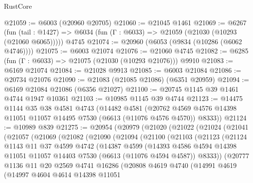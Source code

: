 \begin{lexlean}{RustCore}
\begin{coremodule}
@21059 := @6003 (@20960 @20705)
@21060 := @21045 @1461
@21069 := @6267
    (fun (tail : @1427) => @6034 (fun (Γ : @6033) => @21059 (@21030 (@10293 (@21060 @6065)))))
    @4745
@21074 := @20960 (@6053 (@9834 (@10286 (@6062 @4746))))
@21075 := @6003 @21074
@21076 := @21060 @4745
@21082 := @6285 (fun (Γ : @6033) => @21075 (@21030 (@10293 @21076))) @9910
@21083 := @6169 @21074
@21084 := @21028 @9913
@21085 := @6003 @21084
@21086 := @20734 @21076
@21090 := @21083 (@21085 @21086) (@6351 @20959)
@21094 := @6169 @21084 @21086 (@6356 @21027)
@21100 := @20745 @1145 @39 @1461 @4744 @1947 @10361
@21103 := @10985 @1145 @39 @4744
@21123 := @14475
    @1144
    @35
    @38
    @4581
    @4743
    (@14482
      @4581
      (@20762 @4569 @4576 @14398 @11051 @11057 @14495 @7530 (@6613 (@11076 @4576 @4570)) @8333))
@21124 := @10989 @839
@21275 := @20954
    (@20979
      (@21020
        (@21022
          (@21024
            (@21041
              (@21057
                (@21069
                  (@21082
                    (@21090
                      (@21094
                        (@21100
                          (@21103
                            (@21123
                              (@21124
                                @1143
                                @11
                                @37
                                @4599
                                @4742
                                (@14387
                                  @4599
                                  (@14393
                                    @4586
                                    @4594
                                    @14398
                                    @11051
                                    @11057
                                    @14403
                                    @7530
                                    (@6613 (@11076 @4594 @4587))
                                    @8333))
                                (@20777
                                  @1136
                                  @11
                                  @20
                                  @2569
                                  @4741
                                  @16286
                                  (@20808
                                    @4619
                                    @4740
                                    (@14991
                                      @4619
                                      (@14997
                                        @4604
                                        @4614
                                        @14398
                                        @11051

\end{coremodule}
\end{lexlean}
